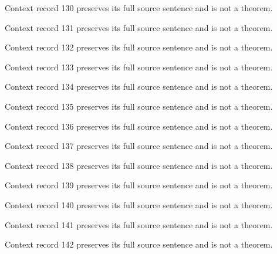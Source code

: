 \documentclass{article}
\begin{document}
\begin{remark}\label{train:context:130}Context record 130 preserves its full source sentence and is not a theorem.\end{remark}
\begin{remark}\label{train:context:131}Context record 131 preserves its full source sentence and is not a theorem.\end{remark}
\begin{remark}\label{train:context:132}Context record 132 preserves its full source sentence and is not a theorem.\end{remark}
\begin{remark}\label{train:context:133}Context record 133 preserves its full source sentence and is not a theorem.\end{remark}
\begin{remark}\label{train:context:134}Context record 134 preserves its full source sentence and is not a theorem.\end{remark}
\begin{remark}\label{train:context:135}Context record 135 preserves its full source sentence and is not a theorem.\end{remark}
\begin{remark}\label{train:context:136}Context record 136 preserves its full source sentence and is not a theorem.\end{remark}
\begin{remark}\label{train:context:137}Context record 137 preserves its full source sentence and is not a theorem.\end{remark}
\begin{remark}\label{train:context:138}Context record 138 preserves its full source sentence and is not a theorem.\end{remark}
\begin{remark}\label{train:context:139}Context record 139 preserves its full source sentence and is not a theorem.\end{remark}
\begin{remark}\label{train:context:140}Context record 140 preserves its full source sentence and is not a theorem.\end{remark}
\begin{remark}\label{train:context:141}Context record 141 preserves its full source sentence and is not a theorem.\end{remark}
\begin{remark}\label{train:context:142}Context record 142 preserves its full source sentence and is not a theorem.\end{remark}
\end{document}

